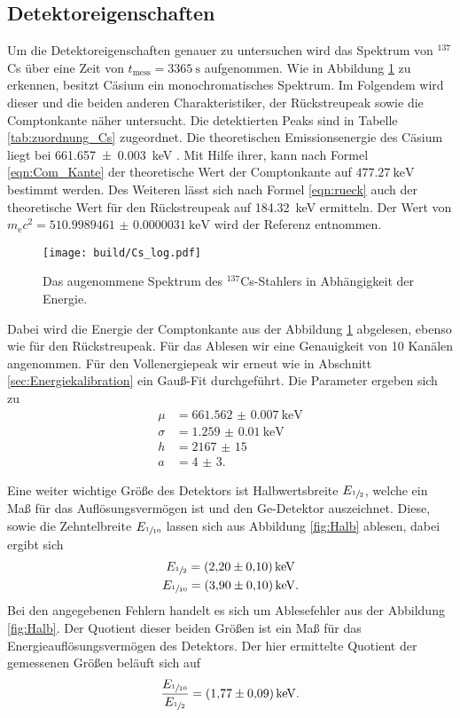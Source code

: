 \subsection{Detektoreigenschaften}
\label{sec:Detektoreigenschaften}
Um die Detektoreigenschaften genauer zu untersuchen wird das Spektrum von ${}^{137}$Cs über eine Zeit
von $t_\text{mess} = \SI{3365}{\second}$ aufgenommen. Wie in Abbildung \ref{fig:Cs_log} zu erkennen, besitzt Cäsium
ein monochromatisches Spektrum. Im Folgendem wird dieser und die beiden anderen Charakteristiker, der Rückstreupeak
sowie die Comptonkante näher untersucht. Die detektierten Peaks sind in Tabelle \ref{tab:zuordnung_Cs} zugeordnet. 
Die theoretischen Emissionsenergie des Cäsium liegt bei \SI{661.657(3)}{\kilo\electronvolt} \cite{referenz1}. Mit Hilfe
ihrer, kann nach Formel \ref{eqn:Com_Kante} der theoretische Wert der Comptonkante auf $\SI{477.27}{\kilo\electronvolt}$
bestimmt werden. Des Weiteren lässt sich nach Formel \ref{eqn:rueck} auch der theoretische Wert für den Rückstreupeak
auf \SI{184.32}{\kilo\electronvolt} ermitteln. Der Wert von $m_\text{e} c^2 = \SI{510.9989461(31)}{\kilo\electronvolt}$ wird 
der Referenz \cite{codata} entnommen. 
\begin{figure}[htb]
 \centering
 \texttt{[image: build/Cs\_log.pdf]}
 \caption{Das augenommene Spektrum des ${}^{137}$Cs-Stahlers in Abhängigkeit der Energie.}
 \label{fig:Cs_log}
\end{figure}

Dabei wird die Energie der Comptonkante aus der Abbildung \ref{fig:Cs_log} abgelesen, ebenso wie für den 
Rückstreupeak. Für das Ablesen wir eine Genauigkeit von \num{10} Kanälen angenommen.
Für den Vollenergiepeak wir erneut wie in Abschnitt \ref{sec:Energiekalibration} ein Gauß-Fit durchgeführt.
Die Parameter ergeben sich zu
\begin{align*}
  \mu &= \SI{661.562(7)}{\kilo\electronvolt} \\
  \sigma &= \SI{1.259(10)}{\kilo\electronvolt} \\
  h &= \num{2167(15)} \\
  a &= \num{4(3)}.
\end{align*}

Eine weiter wichtige Größe des Detektors ist Halbwertsbreite $E_{\sfrac{1}{2}}$, welche ein Maß für das Auflösungsvermögen ist
und den Ge-Detektor auszeichnet. Diese, sowie die Zehntelbreite $E_{\sfrac{1}{10}}$ lassen sich aus Abbildung \ref{fig:Halb} ablesen, 
dabei ergibt sich 
\begin{gather*}
  E_{\sfrac{1}{2}} = \SI{2.20(10)}{\kilo\electronvolt} \\
  E_{\sfrac{1}{10}} = \SI{3.90(10)}{\kilo\electronvolt}.
\end{gather*}
Bei den angegebenen Fehlern handelt es sich um Ablesefehler aus der Abbildung \ref{fig:Halb}.
Der Quotient dieser beiden Größen ist ein Maß für das Energieauflösungsvermögen des Detektors. Der hier ermittelte 
Quotient der gemessenen Größen beläuft sich auf
\begin{equation*}
  \frac{E_{\sfrac{1}{10}}}{E_{\sfrac{1}{2}}} = \SI{1.77(9)}{\kilo\electronvolt}.
\end{equation*}

